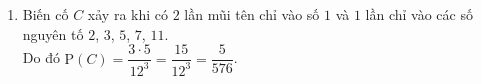 \begin{bt}
{\begin{enumerate}
			\begin{itemize}
				\item[$\bullet$] Trường hợp 1: Lần một mũi tên chỉ số lẻ, hai lần kia mũi tên chỉ số chẵn.
				\item[$\bullet$] Trường hợp 2: Lần hai mũi tên chỉ số lẻ, hai lần kia mũi tên chỉ số chẵn.
				\item[$\bullet$] Trường hợp 3: Lần ba mũi tên chỉ số lẻ, hai lần kia mũi tên chỉ số chẵn.
			\end{itemize}
			Như vậy, số kết quả thuận lợi cho biến cố $B$ là: $n(B)=6^3+6^3+6^3$.\\
			Xác suất của biến cố $A$ là: $\mathrm{P}(B)=\dfrac{6^3\cdot 3}{12^3}=\dfrac{3}{8}$.
			\item Biến cố $C$ xảy ra khi có $2$ lần mũi tên chỉ vào số $1$ và $1$ lần chỉ vào các số nguyên tố $2$, $3$, $5$, $7$, $11$.\\
			Do đó $\mathrm{P}(C)=\dfrac{3 \cdot 5}{12^3}=\dfrac{15}{12^3}=\dfrac{5}{576}$.
		\end{enumerate}
	}
\end{bt}

